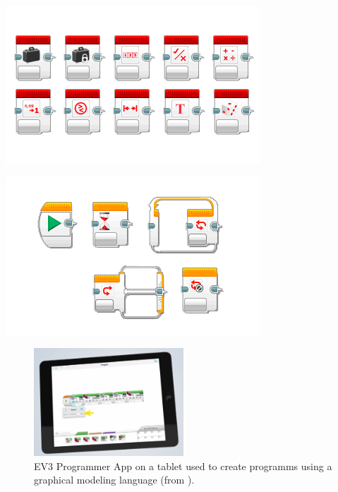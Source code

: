 \documentclass[runningheads,a4paper]{llncs}
\begin{document}
  \begin{minipage}{.5\textwidth} %
	  \centering
    \includegraphics[width=\textwidth]{images/LearnToProgram_operations_blocks_landscape.png}
    \label{fig:operationsblocks}
  \end{minipage}
  \begin{minipage}{.5\textwidth} %
	  \centering
    \includegraphics[width=\textwidth]{images/LearnToProgram_flow_blocks_landscape.png}
    \label{fig:flowblocks}
  \end{minipage}
  
    \begin{figure}[H]
	  \centering
    \includegraphics[width=0.5\textwidth]{images/mindstorms0.PNG}
	  \caption{EV3 Programmer App on a tablet used to create programms using a graphical modeling language (from \cite{legoev3}).}
	  \label{fig:ev3app}
    \end{figure}
\end{document}
